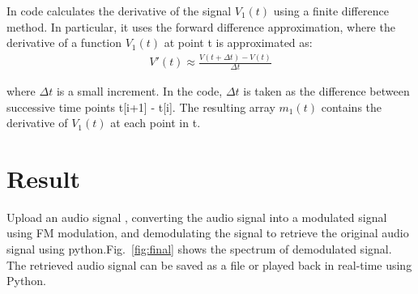 \documentclass[journal,5pt,twocolumn]{IEEEtran}
\newcommand\figref{Fig.~\ref}
\begin{document}
In code calculates the derivative of the signal $V_1(t)$ using a finite difference method. In particular, it uses the forward difference approximation, where the derivative of a function $V_1(t)$ at point t is approximated as:
\begin{align}
V'(t) \approx \frac{V(t+\Delta t) - V(t)}{\Delta t}
\end{align}

 where ${\Delta t}$  is a small increment. In the code, ${\Delta t}$ is taken as the difference between successive time points t[i+1] - t[i].
 The resulting array $m_1(t)$  contains  the derivative of $V_1(t)$ at each point in t.

\section{\textbf{Result}}

  Upload an audio signal , converting the audio signal into a modulated signal using FM modulation,  and demodulating the signal to retrieve the original audio signal using python.\figref{fig:final} shows the spectrum of demodulated signal. The retrieved audio signal can be saved as a file or played back in real-time using Python.

\begin{center}
\end{center}
\end{document}
